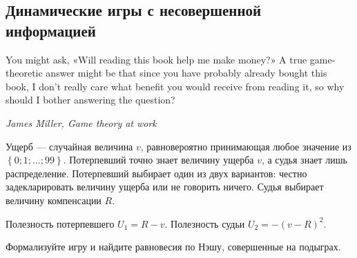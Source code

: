 \subsection{Динамические игры с несовершенной информацией}
%
\begin{rem}
You might ask, «Will reading this book help me make money?» A true game-theoretic answer might be that since you have probably already bought this book, I don't really care what benefit you would receive from reading it, so why should I bother answering the question?

{\it James Miller, Game theory at work \cite{miller:gtw}}
\end{rem}


\begin{problem}
Ущерб — случайная величина  $v$, равновероятно принимающая любое значение из  $\left\{0;1;\ldots ;99\right\}$. Потерпевший точно знает величину ущерба  $v$, а судья знает лишь распределение. Потерпевший выбирает один из двух вариантов: честно задекларировать величину ущерба или не говорить ничего. Судья выбирает величину компенсации  $R$.\par
Полезность потерпевшего  $U_{1} =R-v$. Полезность судьи  $U_{2} =-\left(v-R\right)^{2} $.\par
Формализуйте игру и найдите равновесия по Нэшу, совершенные на подыграх.



\begin{sol}

\end{sol}
\end{problem}



